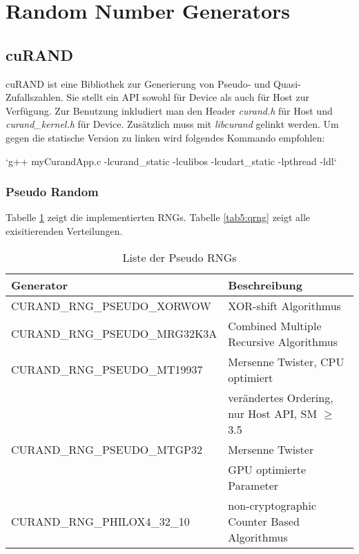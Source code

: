	\section{Random Number Generators}
		\subsection{cuRAND}
		cuRAND ist eine Bibliothek zur Generierung von Pseudo- und Quasi-Zufallszahlen. Sie stellt ein \Gls{API} sowohl für Device als auch für Host zur Verfügung. Zur Benutzung inkludiert man den Header \textit{curand.h} für Host und \textit{curand{\_}kernel.h} für Device. Zusätzlich muss mit \textit{libcurand} gelinkt werden. Um gegen die statische Version zu linken wird folgendes Kommando empfohlen: 
		
		\li`g++ myCurandApp.c -lcurand_static -lculibos -lcudart_static -lpthread -ldl`
		
			\subsubsection{Pseudo Random}
			Tabelle \ref{tab5:prng} zeigt die implementierten RNGs. Tabelle \ref{tab5:qrng} zeigt alle exisitierenden Verteilungen.
			\begin{table}[h]
			\centering
			\begin{tabular}{|l|l|}
				\hline
				\textbf{Generator} & \textbf{Beschreibung} \\ \hline\hline
				CURAND{\_}RNG{\_}PSEUDO{\_}XORWOW    & XOR-shift Algorithmus \\ \hline
				CURAND{\_}RNG{\_}PSEUDO{\_}MRG32K3A  & Combined Multiple Recursive Algorithmus \\ \hline
				CURAND{\_}RNG{\_}PSEUDO{\_}MT19937   & Mersenne Twister, CPU optimiert \\
				                                     & verändertes Ordering, nur Host API, SM $\geq$ 3.5 \\ \hline
				CURAND{\_}RNG{\_}PSEUDO{\_}MTGP32    & Mersenne Twister \\
				                                     & GPU optimierte Parameter \\ \hline
				CURAND{\_}RNG{\_}PHILOX4{\_}32{\_}10 & non-cryptographic Counter Based Algorithmus \\ \hline\bottomrule
			\end{tabular}
			\caption{Liste der Pseudo RNGs}
			\label{tab5:prng}
			\end{table}
			
